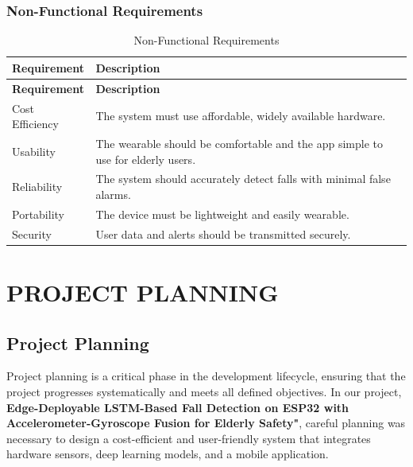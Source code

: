 \documentclass[a4paper, 12pt]{report}
\begin{document}
\subsection{Non-Functional Requirements}
\begin{longtable}{|p{}|p{}|}
    \caption{Non-Functional Requirements}\label{tab:non_functional_requirements} \\
    
    \hline
    \textbf{Requirement} & \textbf{Description} \\
    \hline
    \endfirsthead

    \hline
    \textbf{Requirement} & \textbf{Description} \\
    \hline
    \endhead

    \hline
    \endfoot

    \hline
    \endlastfoot

    Cost Efficiency & The system must use affordable, widely available hardware. \\
    \hline
    Usability & The wearable should be comfortable and the app simple to use for elderly users. \\
    \hline
    Reliability & The system should accurately detect falls with minimal false alarms. \\
    \hline
    Portability & The device must be lightweight and easily wearable. \\
    \hline
    Security & User data and alerts should be transmitted securely. \\
\end{longtable}


\chapter{PROJECT PLANNING}

\section{Project Planning}

Project planning is a critical phase in the development lifecycle, ensuring that the project progresses systematically and meets all defined objectives. In our project, \textbf{Edge-Deployable LSTM-Based Fall Detection on ESP32 with Accelerometer-Gyroscope Fusion for Elderly Safety"}, careful planning was necessary to design a cost-efficient and user-friendly system that integrates hardware sensors, deep learning models, and a mobile application.
\end{document}
